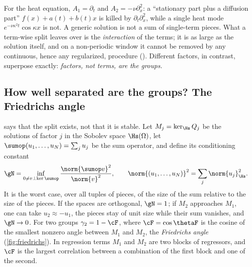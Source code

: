 For the heat equation, $A_1=\partial_t$ and $A_2=-\nu\partial_x^2$: a ``stationary part plus a diffusion part''
$f(x)+a(t)+b(t)x$ is killed by $\partial_t\partial_x^2$, while a single heat mode $e^{-\nu\kappa^2t}\cos\kappa x$ is not. A
generic solution is not a sum of single-term pieces. What a term-wise split leaves over is the \emph{interaction} of the
terms; it is as large as the solution itself, and on a non-periodic window it cannot be removed by any continuous,
hence any regularized, procedure (\SMinteraction). Different factors, in contrast, superpose exactly: \emph{factors, not
terms, are the groups.}


\subsection{How well separated are the groups? The Friedrichs angle}\label{sec:cond}
 says that the split exists, not that it is stable. Let $M_j=\ker_{\Hs}Q_j$ be the solutions of factor
$j$ in the Sobolev space $\Hs(\Omega)$, let $\sumop(u_1,\dots,u_N)=\sum_ju_j$ be the sum operator, and define its
conditioning constant
\begin{equation}\label{eq:gammaN}
  \gN=\inf_{0\neq v\perp\ker\sumop}\frac{\norm{\sumop v}^2}{\norm{v}^2},\qquad \norm{(u_1,\dots,u_N)}^2=\sum_j\norm{u_j}_{\Hs}^2 .
\end{equation}
It is the worst case, over all tuples of pieces, of the size of the sum relative to the size of the pieces. If the
spaces are orthogonal, $\gN=1$; if $M_2$ approaches $M_1$, one can take $u_2\approx-u_1$, the pieces stay of unit size
while their sum vanishes, and $\gN\to0$. For two groups $\gamma_2=1-\cF$, where $\cF=\cos\thetaF$ is the cosine of the
smallest nonzero angle between $M_1$ and $M_2$, the \emph{Friedrichs angle}~\cite{Deu01} (\cref{fig:friedrichs}). In
regression terms $M_1$ and $M_2$ are two blocks of regressors, and $\cF$ is the largest correlation between a combination
of the first block and one of the second.

